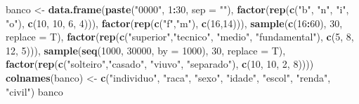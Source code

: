 \documentclass[]{book}
\newenvironment{Shaded}{\begin{snugshade}}{\end{snugshade}}
\newcommand{\DataTypeTok}[1]{\textcolor[rgb]{0.13,0.29,0.53}{#1}}
\newcommand{\DecValTok}[1]{\textcolor[rgb]{0.00,0.00,0.81}{#1}}
\newcommand{\KeywordTok}[1]{\textcolor[rgb]{0.13,0.29,0.53}{\textbf{#1}}}
\newcommand{\NormalTok}[1]{#1}
\newcommand{\OperatorTok}[1]{\textcolor[rgb]{0.81,0.36,0.00}{\textbf{#1}}}
\newcommand{\StringTok}[1]{\textcolor[rgb]{0.31,0.60,0.02}{#1}}
\theoremstyle{definition}
\theoremstyle{definition}
\theoremstyle{definition}
\theoremstyle{remark}
\begin{document}
\begin{Shaded}
\begin{Highlighting}[]
\NormalTok{banco <-}\StringTok{ }\KeywordTok{data.frame}\NormalTok{(}\KeywordTok{paste}\NormalTok{(}\StringTok{"0000"}\NormalTok{, }\DecValTok{1}\OperatorTok{:}\DecValTok{30}\NormalTok{, }\DataTypeTok{sep =} \StringTok{""}\NormalTok{), }
                    \KeywordTok{factor}\NormalTok{(}\KeywordTok{rep}\NormalTok{(}\KeywordTok{c}\NormalTok{(}\StringTok{"b"}\NormalTok{, }\StringTok{"n"}\NormalTok{, }\StringTok{"i"}\NormalTok{, }\StringTok{"o"}\NormalTok{), }\KeywordTok{c}\NormalTok{(}\DecValTok{10}\NormalTok{, }\DecValTok{10}\NormalTok{, }\DecValTok{6}\NormalTok{, }\DecValTok{4}\NormalTok{))), }
                    \KeywordTok{factor}\NormalTok{(}\KeywordTok{rep}\NormalTok{(}\KeywordTok{c}\NormalTok{(}\StringTok{"f"}\NormalTok{,}\StringTok{"m"}\NormalTok{), }\KeywordTok{c}\NormalTok{(}\DecValTok{16}\NormalTok{,}\DecValTok{14}\NormalTok{))), }
                    \KeywordTok{sample}\NormalTok{(}\KeywordTok{c}\NormalTok{(}\DecValTok{16}\OperatorTok{:}\DecValTok{60}\NormalTok{), }\DecValTok{30}\NormalTok{, }\DataTypeTok{replace =}\NormalTok{ T), }
                    \KeywordTok{factor}\NormalTok{(}\KeywordTok{rep}\NormalTok{(}\KeywordTok{c}\NormalTok{(}\StringTok{"superior"}\NormalTok{,}\StringTok{"tecnico"}\NormalTok{, }\StringTok{"medio"}\NormalTok{, }\StringTok{"fundamental"}\NormalTok{), }\KeywordTok{c}\NormalTok{(}\DecValTok{5}\NormalTok{, }\DecValTok{8}\NormalTok{, }\DecValTok{12}\NormalTok{, }\DecValTok{5}\NormalTok{))), }
                    \KeywordTok{sample}\NormalTok{(}\KeywordTok{seq}\NormalTok{(}\DecValTok{1000}\NormalTok{, }\DecValTok{30000}\NormalTok{, }\DataTypeTok{by =} \DecValTok{1000}\NormalTok{), }\DecValTok{30}\NormalTok{, }\DataTypeTok{replace =}\NormalTok{ T),  }
                    \KeywordTok{factor}\NormalTok{(}\KeywordTok{rep}\NormalTok{(}\KeywordTok{c}\NormalTok{(}\StringTok{"solteiro"}\NormalTok{,}\StringTok{"casado"}\NormalTok{, }\StringTok{"viuvo"}\NormalTok{, }\StringTok{"separado"}\NormalTok{), }\KeywordTok{c}\NormalTok{(}\DecValTok{10}\NormalTok{, }\DecValTok{10}\NormalTok{, }\DecValTok{2}\NormalTok{, }\DecValTok{8}\NormalTok{))))  }
\KeywordTok{colnames}\NormalTok{(banco) <-}\StringTok{ }\KeywordTok{c}\NormalTok{(}\StringTok{"individuo"}\NormalTok{, }\StringTok{"raca"}\NormalTok{, }\StringTok{"sexo"}\NormalTok{, }\StringTok{"idade"}\NormalTok{, }\StringTok{"escol"}\NormalTok{, }\StringTok{"renda"}\NormalTok{, }\StringTok{"civil"}\NormalTok{) }
\NormalTok{banco}
\end{Highlighting}
\end{Shaded}
\end{document}
